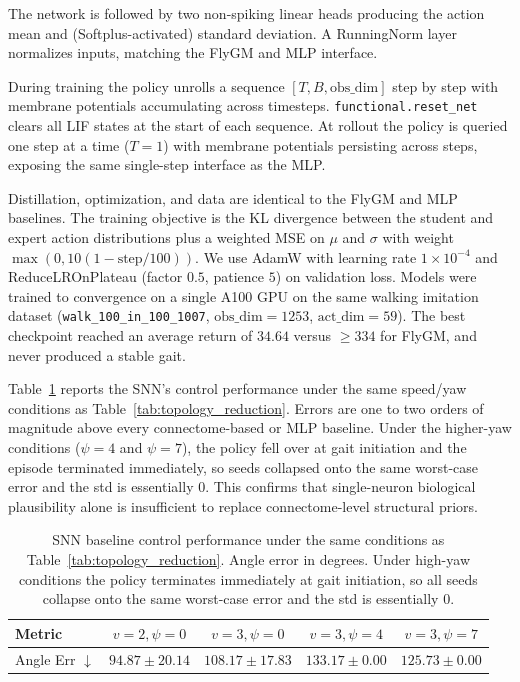 \documentclass[a4paper]{easychair}
\begin{document}
The network is followed by two non-spiking linear heads producing the action mean and (Softplus-activated) standard deviation. A RunningNorm layer normalizes inputs, matching the FlyGM and MLP interface.

During training the policy unrolls a sequence $[T, B, \text{obs\_dim}]$ step by step with membrane potentials accumulating across timesteps. \texttt{functional.reset\_net} clears all LIF states at the start of each sequence. At rollout the policy is queried one step at a time ($T{=}1$) with membrane potentials persisting across steps, exposing the same single-step interface as the MLP.

Distillation, optimization, and data are identical to the FlyGM and MLP baselines. The training objective is the KL divergence between the student and expert action distributions plus a weighted MSE on $\mu$ and $\sigma$ with weight $\max(0, 10(1{-}\text{step}/100))$. We use AdamW with learning rate $1{\times}10^{-4}$ and ReduceLROnPlateau (factor $0.5$, patience $5$) on validation loss. Models were trained to convergence on a single A100 GPU on the same walking imitation dataset (\texttt{walk\_100\_in\_100\_1007}, $\text{obs\_dim}{=}1253$, $\text{act\_dim}{=}59$). The best checkpoint reached an average return of $34.64$ versus $\geq 334$ for FlyGM, and never produced a stable gait.

Table~\ref{tab:snn_perf} reports the SNN's control performance under the same speed/yaw conditions as Table~\ref{tab:topology_reduction}. Errors are one to two orders of magnitude above every connectome-based or MLP baseline. Under the higher-yaw conditions ($\psi{=}4$ and $\psi{=}7$), the policy fell over at gait initiation and the episode terminated immediately, so seeds collapsed onto the same worst-case error and the std is essentially $0$. This confirms that single-neuron biological plausibility alone is insufficient to replace connectome-level structural priors.

\begin{table}[htbp]
\centering
\small
\setlength{\tabcolsep}{6pt}
\renewcommand{\arraystretch}{1.1}
\begin{tabular}{l cccc}
\toprule
\textbf{Metric} & $v{=}2,\psi{=}0$ & $v{=}3,\psi{=}0$ & $v{=}3,\psi{=}4$ & $v{=}3,\psi{=}7$ \\
\midrule
Angle Err $\downarrow$ & $94.87{\pm}20.14$ & $108.17{\pm}17.83$ & $133.17{\pm}0.00$ & $125.73{\pm}0.00$ \\
\bottomrule
\end{tabular}
\vspace{0.5em}
\caption{SNN baseline control performance under the same conditions as Table~\ref{tab:topology_reduction}. Angle error in degrees. Under high-yaw conditions the policy terminates immediately at gait initiation, so all seeds collapse onto the same worst-case error and the std is essentially $0$.}
\label{tab:snn_perf}
\end{table}
\end{document}
